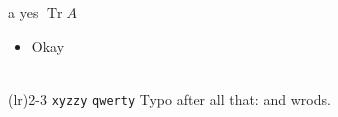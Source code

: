 \usepackage{listings,minted}
\makeatletter
\def\my@cmd{x}\def\foo#1{#1}\let\bar\relax\newif\ifdraft
\makeatother
\foo{a} \bar \drafttrue \ifdraft yes\fi
{}\thetask
\DeclareMathOperator{\Tr}{Tr} $\Tr A$
 
\usepackage{tikz}
\begin{itemize}[label=--]\item Okay\end{itemize}
\\[2pt] \hspace*{1cm} \vspace{-3mm}
\cmidrule(lr){2-3}
\lstinline|xyzzy| \texttt{qwerty}
Typo after all that: \undefinedthing and wrods.
